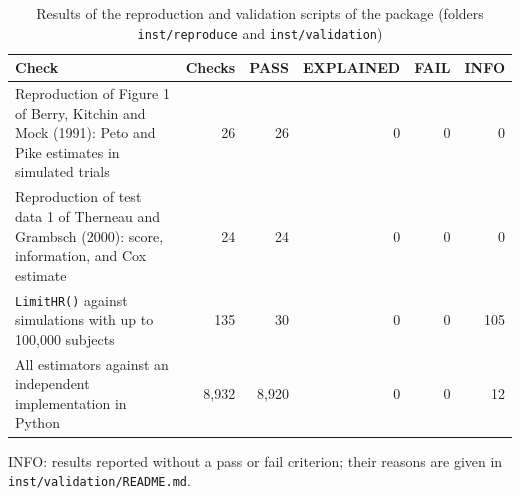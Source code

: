 \begin{table}
\caption{Results of the reproduction and validation scripts of the package (folders \texttt{inst/reproduce} and \texttt{inst/validation})}
\label{tab:validation}
\centering
\footnotesize
\setlength{\tabcolsep}{4pt}
\begin{tabular}{>{\raggedright\arraybackslash}p{5.2cm}rrrrr}
\toprule
Check & Checks & PASS & EXPLAINED & FAIL & INFO \\
\midrule
Reproduction of Figure 1 of Berry, Kitchin and Mock (1991): Peto and Pike estimates in simulated trials & 26 & 26 & 0 & 0 & 0 \\
Reproduction of test data 1 of Therneau and Grambsch (2000): score, information, and Cox estimate & 24 & 24 & 0 & 0 & 0 \\
\texttt{LimitHR()} against simulations with up to 100,000 subjects & 135 & 30 & 0 & 0 & 105 \\
All estimators against an independent implementation in Python & 8,932 & 8,920 & 0 & 0 & 12 \\
\bottomrule
\end{tabular}
\par\smallskip
{\footnotesize INFO: results reported without a pass or fail criterion; their reasons are given in \texttt{inst/validation/README.md}.\par}
\end{table}
